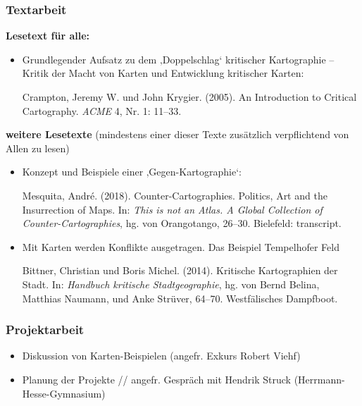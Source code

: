 \documentclass[
  ngerman,
]{article}
\providecommand{\tightlist}{%
  \setlength{\itemsep}{0pt}\setlength{\parskip}{0pt}}
\begin{document}
\hypertarget{textarbeit-3}{%
\subsubsection*{Textarbeit}\label{textarbeit-3}}

\textbf{Lesetext für alle:}

\begin{itemize}
\item
  Grundlegender Aufsatz zu dem ‚Doppelschlag` kritischer Kartographie -- Kritik der Macht von Karten und Entwicklung kritischer Karten:

  Crampton, Jeremy W. und John Krygier. (2005). An Introduction to Critical Cartography. \emph{ACME} 4, Nr. 1: 11--33.
\end{itemize}

\textbf{weitere Lesetexte}
(mindestens einer dieser Texte zusätzlich verpflichtend von Allen zu lesen)

\begin{itemize}
\item
  Konzept und Beispiele einer ‚Gegen-Kartographie`:

  Mesquita, André. (2018). Counter-Cartographies. Politics, Art and the Insurrection of Maps. In: \emph{This is not an Atlas. A Global Collection of Counter-Cartographies}, hg. von Orangotango, 26--30. Bielefeld: transcript.
\item
  Mit Karten werden Konflikte ausgetragen. Das Beispiel Tempelhofer Feld

  Bittner, Christian und Boris Michel. (2014). Kritische Kartographien der Stadt. In: \emph{Handbuch kritische Stadtgeographie}, hg. von Bernd Belina, Matthias Naumann, und Anke Strüver, 64--70. Westfälisches Dampfboot.
\end{itemize}

\hypertarget{projektarbeit-2}{%
\subsubsection*{Projektarbeit}\label{projektarbeit-2}}

\begin{itemize}
\tightlist
\item
  Diskussion von Karten-Beispielen (angefr. Exkurs Robert Viehf)
\item
  Planung der Projekte // angefr. Gespräch mit Hendrik Struck (Herrmann-Hesse-Gymnasium)
\end{itemize}
\end{document}
